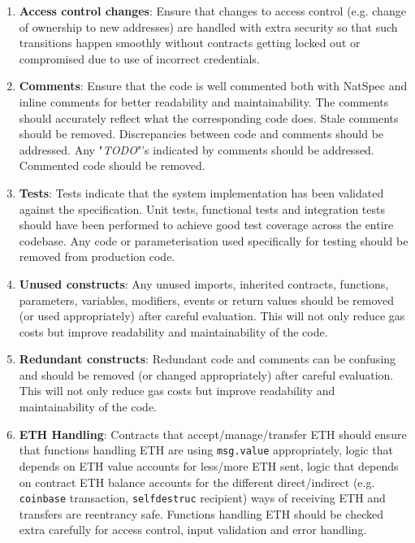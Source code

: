\begin{enumerate}
\item\textbf{Access control changes}: Ensure that changes to access control (e.g. change of ownership to new addresses) are handled with extra security so that such transitions happen smoothly without contracts getting locked out or compromised due to use of incorrect credentials.

\item\textbf{Comments}: Ensure that the code is well commented both with NatSpec and inline comments for better readability and maintainability. The comments should accurately reflect what the corresponding code does. Stale comments should be removed. Discrepancies between code and comments should be addressed. Any "\textit{TODO}"’s indicated by comments should be addressed. Commented code should be removed.

\item\textbf{Tests}: Tests indicate that the system implementation has been validated against the specification. Unit tests, functional tests and integration tests should have been performed to achieve good test coverage across the entire codebase. Any code or parameterisation used specifically for testing should be removed from production code.

\item\textbf{Unused constructs}: Any unused imports, inherited contracts, functions, parameters, variables, modifiers, events or return values should be removed (or used appropriately) after careful evaluation. This will not only reduce gas costs but improve readability and maintainability of the code.

\item\textbf{Redundant constructs}: Redundant code and comments can be confusing and should be removed (or changed appropriately) after careful evaluation. This will not only reduce gas costs but improve readability and maintainability of the code.

\item\textbf{ETH Handling}: Contracts that accept/manage/transfer ETH should ensure that functions handling ETH are using \verb|msg.value| appropriately, logic that depends on ETH value accounts for less/more ETH sent, logic that depends on contract ETH balance accounts for the different direct/indirect (e.g. \verb|coinbase| transaction, \verb|selfdestruc| recipient) ways of receiving ETH and transfers are reentrancy safe. Functions handling ETH should be checked extra carefully for access control, input validation and error handling.


\end{enumerate}
